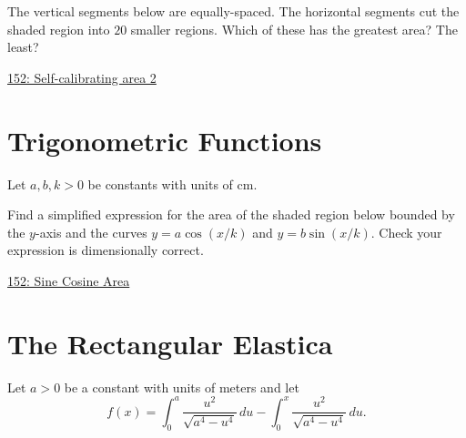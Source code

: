 \documentclass{ximera}
\begin{document}
\begin{question} \label{QPldfefdfsdfd}

The vertical segments below are equally-spaced. The horizontal segments cut the shaded region into $20$ smaller regions. Which of these has the greatest area? The least?

\begin{onlineOnly}
    \begin{center}
\end{center}
\end{onlineOnly}

\href{https://www.desmos.com/calculator/dir9hpzvse}{152: Self-calibrating area 2}
\end{question}


\section{Trigonometric Functions}

\begin{question} \label{QLkfeREdfd}
Let $a,b,k>0$ be constants with units of cm.

Find a simplified expression for the area of the shaded region below bounded by the $y$-axis and the curves $y=a\cos (x/k)$ and $y=b\sin (x/k)$. Check your expression is dimensionally correct.

\begin{onlineOnly}
    \begin{center}
\end{center}
\end{onlineOnly}

\href{https://www.desmos.com/calculator/ps1m0hksl0}{152: Sine Cosine Area}
\end{question}


\section{The Rectangular Elastica}

Let $a>0$ be a constant with units of meters and let
\[
   f(x) = \int_0^a \frac{u^2}{\sqrt{a^4-u^4}} \, du - \int_0^x \frac{u^2}{\sqrt{a^4-u^4}} \, du .
\]
\end{document}
